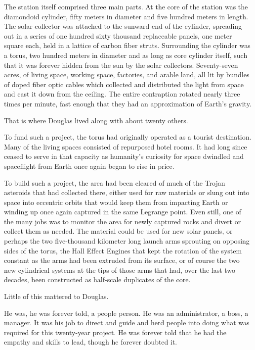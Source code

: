 The station itself comprised three main parts. At the core of the station was the diamondoid cylinder, fifty meters in diameter and five hundred meters in length. The solar collector was attached to the sunward end of the cylinder, spreading out in a series of one hundred sixty thousand replaceable panels, one meter square each, held in a lattice of carbon fiber struts. Surrounding the cylinder was a torus, two hundred meters in diameter and as long as core cylinder itself, such that it was forever hidden from the sun by the solar collectors. Seventy-seven acres, of living space, working space, factories, and arable land, all lit by bundles of doped fiber optic cables which collected and distributed the light from space and cast it down from the ceiling. The entire contraption rotated nearly three times per minute, fast enough that they had an approximation of Earth's gravity.

That is where Douglas lived along with about twenty others.

To fund such a project, the torus had originally operated as a tourist destination. Many of the living spaces consisted of repurposed hotel rooms. It had long since ceased to serve in that capacity as humanity's curiosity for space dwindled and spaceflight from Earth once again began to rise in price.

To build such a project, the area had been cleared of much of the Trojan asteroids that had collected there, either used for raw materials or slung out into space into eccentric orbits that would keep them from impacting Earth or winding up once again captured in the same Legrange point. Even still, one of the many jobs was to monitor the area for newly captured rocks and divert or collect them as needed. The material could be used for new solar panels, or perhaps the two five-thousand kilometer long launch arms sprouting on opposing sides of the torus, the Hall Effect Engines that kept the rotation of the system constant as the arms had been extruded from its surface, or of course the two new cylindrical systems at the tips of those arms that had, over the last two decades, been constructed as half-scale duplicates of the core.

Little of this mattered to Douglas.

He was, he was forever told, a people person. He was an administrator, a boss, a manager. It was his job to direct and guide and herd people into doing what was required for this twenty-year project. He was forever told that he had the empathy and skills to lead, though he forever doubted it.

